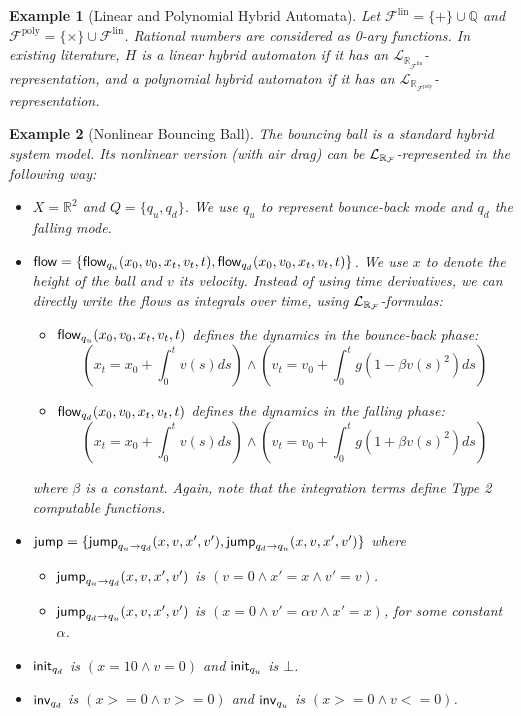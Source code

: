 \documentclass[journal]{IEEEtran}
\newtheorem{example}{Example}
\begin{document}
\begin{example}[Linear and Polynomial Hybrid Automata] Let $\mathcal{F}^{\mathrm{lin}} = \{+\}\cup \mathbb{Q}$ and $\mathcal{F}^{\mathrm{poly}}=\{\times\}\cup\mathcal{F}^{\mathrm{lin}}$. Rational numbers are considered as 0-ary functions. In existing literature, $H$ is a {\em linear hybrid automaton} if it has an $\mathcal{L}_{\mathbb{R}_{\mathcal{F}^{\mathrm{lin}}}}$-representation, and a {\em polynomial hybrid automaton} if it has an $\mathcal{L}_{\mathbb{R}_{\mathcal{F}^{\mathrm{poly}}}}$-representation.
\end{example}

\begin{example}[Nonlinear Bouncing Ball]
The bouncing ball is a standard hybrid system model. Its nonlinear version (with air drag) can be $\mathcal{L}_{\mathbb{R}_{\mathcal{F}}}$-represented in the following way:
\begin{itemize}
\item $X = \mathbb{R}^2$ and $Q = \{q_u, q_d\}$. We use $q_u$ to represent bounce-back mode and $q_d$ the falling mode.
\item $\mathsf{flow} = \{\mathsf{flow}_{q_u}(x_0, v_0, x_t, v_t, t), \mathsf{flow}_{q_d}(x_0, v_0, x_t, v_t, t)\}$. We use $x$ to denote the height of the ball and $v$ its velocity. Instead of using time derivatives, we can directly write the flows as integrals over time, using $\mathcal{L}_{\mathbb{R}_{\mathcal{F}}}$-formulas:
\begin{itemize}
\item $\mathsf{flow}_{q_u}(x_0, v_0, x_t, v_t, t)$ defines the dynamics in the bounce-back phase:
$$(x_t = x_0 + \int_0^{t} v(s) ds) \wedge (v_t = v_0 + \int_0^t g(1-\beta v(s)^2) ds)$$
\item $\mathsf{flow}_{q_d}(x_0, v_0, x_t, v_t, t)$ defines the dynamics in the falling phase:
$$(x_t = x_0 + \int_0^{t} v(s) ds) \wedge (v_t = v_0 + \int_0^t g(1+\beta v(s)^2) ds)$$
\end{itemize}where
$\beta$ is a constant. Again, note that the integration terms define Type 2 computable functions.
\item $\mathsf{jump} = \{\mathsf{jump}_{q_u \rightarrow q_d} (x, v, x', v'), \mathsf{jump}_{q_d \rightarrow q_u} (x, v, x', v')\}$ where
\begin{itemize}
 \item $\mathsf{jump}_{q_u \rightarrow q_d} (x, v, x', v')$ is $(v= 0 \wedge x' = x \wedge v' = v)$.
\item $\mathsf{jump}_{q_d \rightarrow q_u} (x, v, x', v')$ is $(x= 0 \wedge v' = \alpha v\wedge x'=x)$,  for some constant $\alpha$.
\end{itemize}
\vspace{0.1cm}
\item $\mathsf{init}_{q_d}$ is $(x=10 \wedge v=0)$ and $\mathsf{init}_{q_u}$ is $\bot$.
\item $\mathsf{inv}_{q_d}$ is $(x>=0 \wedge v>=0)$ and $\mathsf{inv}_{q_u}$ is $(x>=0 \wedge v<=0)$.
\end{itemize}
\end{example}
\end{document}
